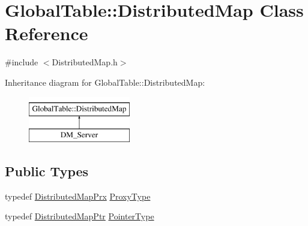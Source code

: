 \hypertarget{class_global_table_1_1_distributed_map}{
\section{GlobalTable::DistributedMap Class Reference}
\label{class_global_table_1_1_distributed_map}
}


{\ttfamily \#include $<$DistributedMap.h$>$}

Inheritance diagram for GlobalTable::DistributedMap:\begin{figure}[H]
\begin{center}
\leavevmode
\includegraphics[height=2cm]{class_global_table_1_1_distributed_map}
\end{center}
\end{figure}
\subsection*{Public Types}
\begin{DoxyCompactItemize}
\item 
typedef \hyperlink{namespace_global_table_a54672ca2efff5152d9759b4eb9957676}{DistributedMapPrx} \hyperlink{class_global_table_1_1_distributed_map_a9c12eff07798c7a775fc2f2e91d7f240}{ProxyType}
\item 
typedef \hyperlink{namespace_global_table_a37c83cf33bd6e59c8b648a60e1309e5b}{DistributedMapPtr} \hyperlink{class_global_table_1_1_distributed_map_a72fa66c995c2be63800ed403c30b64ad}{PointerType}
\end{DoxyCompactItemize}
